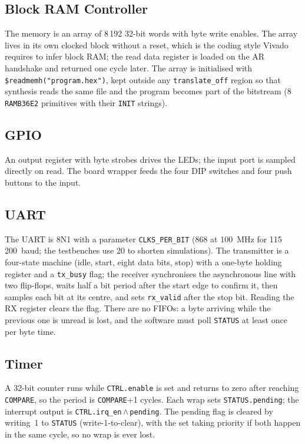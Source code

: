 \documentclass[journal,10pt]{IEEEtran}
\newcommand{\reg}[1]{\texttt{#1}}
\begin{document}
\subsection{Block RAM Controller}
The memory is an array of 8\,192 32-bit words with byte write enables. The
array lives in its own clocked block without a reset, which is the coding
style Vivado requires to infer block RAM; the read data register is loaded on
the AR handshake and returned one cycle later. The array is initialised with
\reg{\$readmemh("program.hex")}, kept outside any \reg{translate\_off}
region so that synthesis reads the same file and the program becomes part of
the bitstream (8 \reg{RAMB36E2} primitives with their \reg{INIT} strings).

\subsection{GPIO}
An output register with byte strobes drives the LEDs; the input port is
sampled directly on read. The board wrapper feeds the four DIP switches and
four push buttons to the input.

\subsection{UART}
The UART is 8N1 with a parameter \reg{CLKS\_PER\_BIT} (868 at 100~MHz for
115\,200~baud; the testbenches use 20 to shorten simulations). The
transmitter is a four-state machine (idle, start, eight data bits, stop) with
a one-byte holding register and a \reg{tx\_busy} flag; the receiver
synchronises the asynchronous line with two flip-flops, waits half a bit
period after the start edge to confirm it, then samples each bit at its
centre, and sets \reg{rx\_valid} after the stop bit. Reading the RX register
clears the flag. There are no FIFOs: a byte arriving while the previous one
is unread is lost, and the software must poll \reg{STATUS} at least once per
byte time.

\subsection{Timer}
A 32-bit counter runs while \reg{CTRL.enable} is set and returns to zero
after reaching \reg{COMPARE}, so the period is \reg{COMPARE}+1 cycles. Each
wrap sets \reg{STATUS.pending}; the interrupt output is
\reg{CTRL.irq\_en}\,$\wedge$\,\reg{pending}. The pending flag is cleared by
writing~1 to \reg{STATUS} (write-1-to-clear), with the set taking priority if
both happen in the same cycle, so no wrap is ever lost.
\end{document}
